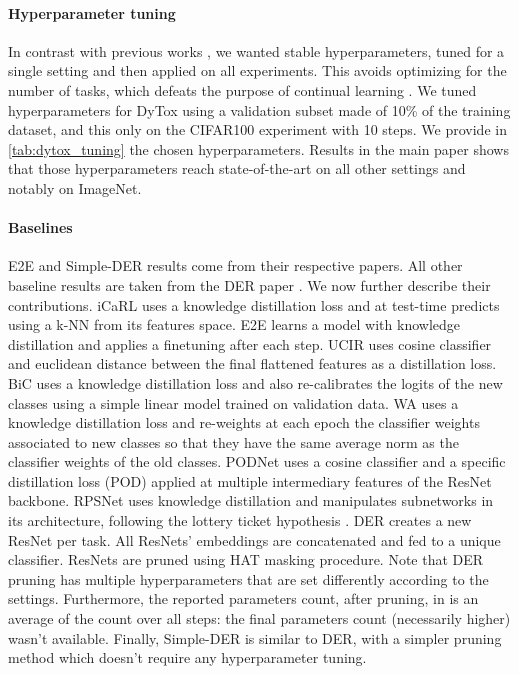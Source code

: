 \paragraph{Hyperparameter tuning} In contrast with previous works
\citep{douillard2020podnet,yan2021der}, we wanted stable hyperparameters, tuned for a single setting
and then applied on all experiments. This avoids optimizing for the number of tasks, which defeats
the purpose of continual learning \citep{farquhar2018robustcontinual}. We tuned hyperparameters for
DyTox using a validation subset made of 10\% of the training dataset, and this only on the CIFAR100
experiment with 10 steps. We provide in \autoref{tab:dytox_tuning} the chosen hyperparameters. Results in
the main paper shows that those hyperparameters reach state-of-the-art on all other settings and
notably on ImageNet.



\paragraph{Baselines} E2E \citep{castro2018end_to_end_inc_learn} and Simple-DER \citep{li2021preserve}
results come from their respective papers. All other baseline results are taken from the DER paper
\citep{yan2021der}. We now further describe their contributions. iCaRL \citep{rebuffi2017icarl} uses a
knowledge distillation loss \citep{hinton2015knowledge_distillation} and at test-time predicts using
a k-NN from its features space. E2E \citep{castro2018end_to_end_inc_learn} learns a model with
knowledge distillation and applies a finetuning after each step. UCIR \citep{hou2019ucir} uses cosine
classifier and euclidean distance between the final flattened features as a distillation loss. BiC
\citep{wu2019bias_correction} uses a knowledge distillation loss and also re-calibrates
\citep{guo2017miscalibration} the logits of the new classes using a simple linear model trained on
validation data. WA \citep{zhao2020weightalignement} uses a knowledge distillation loss and
re-weights at each epoch the classifier weights associated to new classes so that they have the same
average norm as the classifier weights of the old classes. PODNet \citep{douillard2020podnet} uses a
cosine classifier and a specific distillation loss (POD) applied at multiple intermediary features
of the ResNet backbone. RPSNet \citep{rajasegaran2019rpsnet} uses knowledge distillation and
manipulates subnetworks in its architecture, following the lottery ticket hypothesis
\citep{frankle2019lottery_ticket}. DER \citep{yan2021der} creates a new ResNet per task. All ResNets'
embeddings are concatenated and fed to a unique classifier. ResNets are pruned using HAT
\citep{serra2018hat} masking procedure. Note that DER pruning has multiple hyperparameters that are
set differently according to the settings. Furthermore, the reported parameters count, after
pruning, in \citep{yan2021der} is an average of the count over all steps: the final parameters count
(necessarily higher) wasn't available. Finally, Simple-DER \citep{li2021preserve} is similar to DER,
with a simpler pruning method which doesn't require any hyperparameter tuning.


